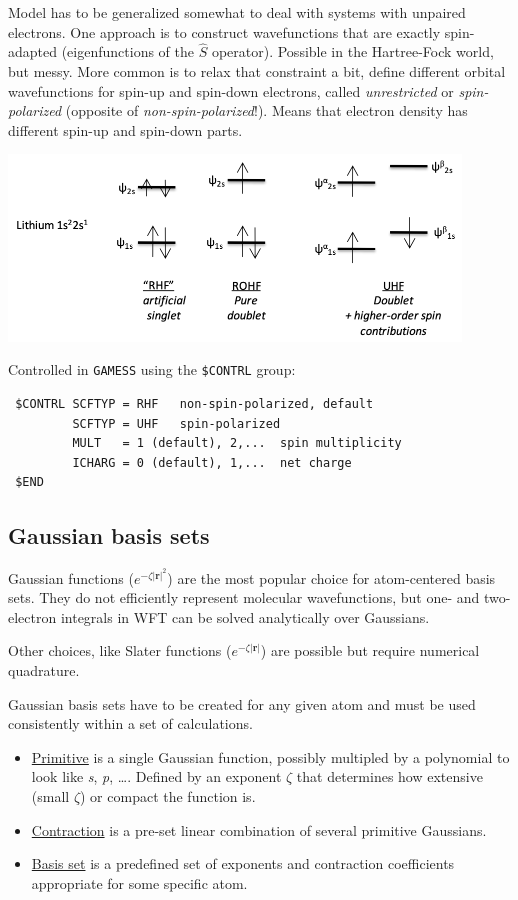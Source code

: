 \documentclass[11pt]{article}
\begin{document}
Model has to be generalized somewhat to deal with systems with unpaired electrons. One approach is to construct wavefunctions that are exactly spin-adapted (eigenfunctions of the \(\hat{S}\) operator). Possible in the Hartree-Fock world, but messy.  More common is to relax that constraint a bit, define different orbital wavefunctions for spin-up and spin-down electrons, called \emph{unrestricted} or \emph{spin-polarized} (opposite of \emph{non-spin-polarized}!).  Means that electron density has different spin-up and spin-down parts.

\begin{center}
\includegraphics[width=0.9\textwidth]{./Images/Polarization.png}
\end{center}

Controlled in \texttt{GAMESS} using the \texttt{\$CONTRL} group:
\begin{verbatim}
 $CONTRL SCFTYP = RHF   non-spin-polarized, default
         SCFTYP = UHF   spin-polarized
         MULT   = 1 (default), 2,...  spin multiplicity
         ICHARG = 0 (default), 1,...  net charge
 $END
\end{verbatim}

\subsection{Gaussian basis sets}
\label{sec:orge9e77b2}
Gaussian functions (\(e^{-\zeta|\mathbf{r}|^2}\)) are the most popular choice for atom-centered basis sets.  They do not efficiently represent molecular wavefunctions, but one- and two-electron integrals in  WFT  can be solved analytically over Gaussians.

Other choices, like Slater functions (\(e^{-\zeta|\mathbf{r}|}\)) are possible but require numerical quadrature.

Gaussian basis sets have to be created for any given atom and must be used consistently within a set of calculations.

\begin{itemize}
\item \uline{Primitive} is a single Gaussian function, possibly multipled by a polynomial to look like
\emph{s}, \emph{p}, \ldots.  Defined by an exponent \(\zeta\) that determines how extensive (small \(\zeta\)) or compact
the function is.
\item \uline{Contraction} is a pre-set linear combination of several primitive Gaussians.
\item \uline{Basis set} is a predefined set of exponents and contraction coefficients appropriate
for some specific atom.
\end{itemize}
\end{document}
